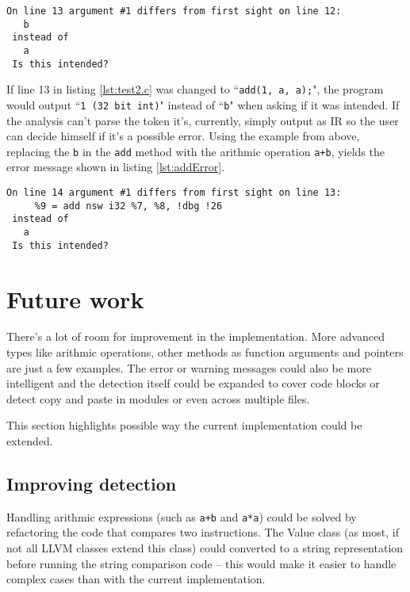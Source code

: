 \documentclass[a4paper,11pt]{article}
\theoremstyle{mytheor}
\begin{document}
\begin{lstlisting}[caption={Pass output for test2.c},label={lst:test2Output}]
On line 13 argument #1 differs from first sight on line 12:
   b
 instead of
   a
 Is this intended?
\end{lstlisting}
If line 13 in listing \ref{lst:test2.c} was changed to ``\verb!add(1, a, a);!", the program would output ``\verb!1 (32 bit int)!" instead of ``\verb!b!" when asking if it was intended.
If the analysis can't parse the token it's, currently, simply output as IR so the user can decide himself if it's a possible error.
Using the example from above, replacing the \verb!b! in the \verb!add! method with the arithmic operation \verb!a+b!, yields the error message shown in listing \ref{lst:addError}.

\begin{lstlisting}[caption={Pass output for modified test2.c},label={lst:addError}]
On line 14 argument #1 differs from first sight on line 13:
     %9 = add nsw i32 %7, %8, !dbg !26
 instead of
   a
 Is this intended?
\end{lstlisting}

\section*{Future work}
There's a lot of room for improvement in the implementation.
More advanced types like arithmic operations, other methods as function arguments and pointers are just a few examples.
The error or warning messages could also be more intelligent and the detection itself could be expanded to cover code blocks or detect copy and paste in modules or even across multiple files.


This section highlights possible way the current implementation could be extended.

\subsection*{Improving detection}
Handling arithmic expressions (such as \verb!a+b! and \verb!a*a!) could be solved by
refactoring the code that compares two instructions. The Value class (as most, if not all LLVM classes extend this class) could converted to a string representation before running the string comparison code -- this would make it easier to handle complex cases than with the current implementation.
\end{document}
